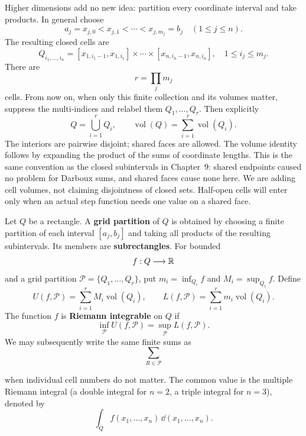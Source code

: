 \begin{center}
\end{center}
Higher dimensions add no new idea: partition every coordinate interval and
take products. In general choose
\[
a_j=x_{j,0}<x_{j,1}<\cdots<x_{j,m_j}=b_j\quad(1\leq j\leq n).
\]
The resulting closed cells are
\[
Q_{i_1,\ldots,i_n}=[x_{1,i_1-1},x_{1,i_1}]\times\cdots
\times[x_{n,i_n-1},x_{n,i_n}],\quad 1\leq i_j\leq m_j.
\]
There are
\[
r=\prod_jm_j
\]
 cells. From now on, when only this finite
collection and its volumes matter, suppress the multi-indices and relabel
them $Q_1,\ldots,Q_r$. Then explicitly
\[
Q=\bigcup_{i=1}^r Q_i,\qquad
\operatorname{vol}(Q)=\sum_{i=1}^r\operatorname{vol}(Q_i).
\]
The interiors are pairwise disjoint; shared faces are allowed. The volume
identity follows by expanding the product of the sums of coordinate lengths.
This is the same convention as the closed subintervals in Chapter~9:
shared endpoints caused no problem for Darboux sums, and shared faces cause
none here. We are adding cell volumes, not claiming disjointness of closed sets.
Half-open cells will enter only when an actual step function needs one value
on a shared face.


\begin{definition}
Let $Q$ be a rectangle.  A \textbf{grid partition} of $Q$ is obtained by
choosing a finite partition of each interval $[a_j,b_j]$ and taking all
products of the resulting subintervals.  Its members are \textbf{subrectangles}.
For bounded
\[
f:Q\longrightarrow\mathbb{R}
\]
and a grid partition $\mathcal P=\{Q_1,\ldots,Q_r\}$, put
$m_i=\inf_{Q_i}f$ and $M_i=\sup_{Q_i}f$. Define
\[
U(f,\mathcal P)=\sum_{i=1}^rM_i\operatorname{vol}(Q_i),
\qquad
L(f,\mathcal P)=\sum_{i=1}^rm_i\operatorname{vol}(Q_i).
\]
The function $f$ is \textbf{Riemann integrable} on $Q$ if
\[
\inf_{\mathcal P}U(f,\mathcal P)
=\sup_{\mathcal P}L(f,\mathcal P).
\]
We may subsequently write the same finite sums as
\[
\sum_{R\in\mathcal P}
\]

when individual cell numbers do not matter. The common value is the multiple Riemann integral (a double integral for
$n=2$, a triple integral for $n=3$), denoted by
\[
\int_Q f(x_1,\ldots,x_n)\,\dd(x_1,\ldots,x_n).
\]
\end{definition}

